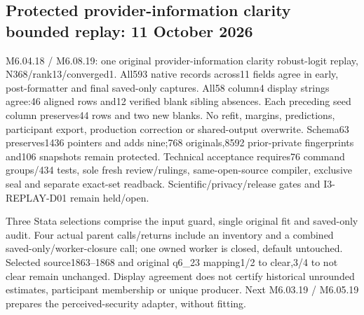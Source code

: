 \documentclass[11pt,a4paper]{article}
\begin{document}
\subsection*{Protected provider-information clarity bounded replay: 11 October 2026}
M6.04.18 / M6.08.19: one original provider-information clarity robust-logit replay, N368/rank13/converged1. All593 native records across11 fields agree in early, post-formatter and final saved-only captures. All58 column4 display strings agree:46 aligned rows and12 verified blank sibling absences. Each preceding seed column preserves44 rows and two new blanks. No refit, margins, predictions, participant export, production correction or shared-output overwrite. Schema63 preserves1436 pointers and adds nine;768 originals,8592 prior-private fingerprints and106 snapshots remain protected. Technical acceptance requires76 command groups/434 tests, sole fresh review/rulings, same-open-source compiler, exclusive seal and separate exact-set readback. Scientific/privacy/release gates and I3-REPLAY-D01 remain held/open.

Three Stata selections comprise the input guard, single original fit and saved-only audit. Four actual parent calls/returns include an inventory and a combined saved-only/worker-closure call; one owned worker is closed, default untouched. Selected source1863--1868 and original q6\_23 mapping1/2 to clear,3/4 to not clear remain unchanged. Display agreement does not certify historical unrounded estimates, participant membership or unique producer. Next M6.03.19 / M6.05.19 prepares the perceived-security adapter, without fitting.
\end{document}
